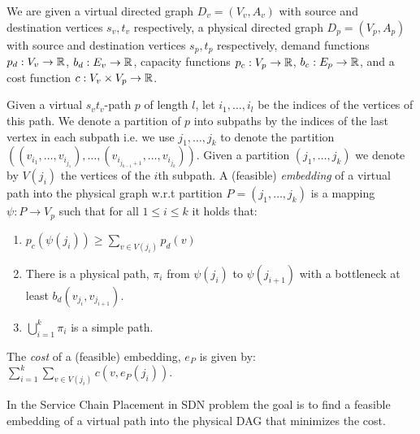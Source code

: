 We are given a virtual directed graph $D_v = (V_v, A_v)$ 
with source and destination vertices $s_v, t_v$ respectively, 
a physical directed graph $D_p = (V_p, A_p)$
with source and destination vertices $s_p, t_p$ respectively,
demand functions $p_d : V_v \to \mathbb{R}$, $b_d : E_v \to \mathbb{R}$,
capacity functions $p_c : V_p \to \mathbb{R}$, $b_c : E_p \to \mathbb{R}$,
and a cost function $c: V_v \times V_p \to \mathbb{R}$. 

Given a virtual $s_vt_v$-path $p$ of length $l$,
let $i_1, \ldots, i_l$ be the indices of the vertices of this path.
We denote a partition of $p$ into subpaths by the indices of the last vertex in
each subpath i.e. we use $j_1, \ldots, j_k$ to denote the partition 
$((v_{i_1}, \ldots, v_{i_{j_1}}), \ldots, (v_{i_{j_{k-1} + 1}}, \ldots,
v_{i_{j_k}}))$.
Given a partition $(j_1, \ldots, j_k)$ we denote by $V(j_i)$ the vertices of the
$i$th subpath.
A (feasible) \emph{embedding} of a virtual path into the physical graph 
w.r.t partition $P = (j_1, \ldots,j_k)$ is a mapping $\psi : P \to V_p$ such that
for all $1 \leq i \leq k$ it holds that:
\begin{enumerate}
  \item $p_c(\psi(j_i)) \geq \sum_{v \in V(j_i)} p_d(v)$
  \item There is a physical path, $\pi_i$ from $\psi(j_i)$ to $\psi(j_{i+1})$ with a
  bottleneck at least $b_d(v_{j_i}, v_{j_{i+1}})$.
  \item $\bigcup_{i = 1}^k \pi_i$ is a simple path.
\end{enumerate}
The \emph{cost} of a (feasible) embedding, $e_P$ is given by:
$\sum_{i = 1}^k \sum_{v \in V(j_i)} c(v, e_P(j_i))$.   

In the Service Chain Placement in SDN problem the goal is to find a
feasible embedding of a virtual path into the physical DAG that minimizes the
cost.

\begin{figure}[ht]
\centering
\scalebox{.8}{

}

\end{figure}
